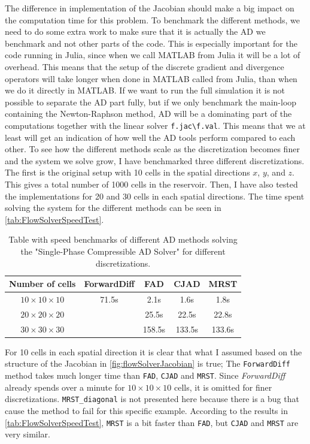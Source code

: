 The difference in implementation of the Jacobian should make a big impact on the computation time for this problem. To benchmark the different methods, we need to do some extra work to make sure that it is actually the AD we benchmark and not other parts of the code. This is especially important for the code running in Julia, since when we call MATLAB from Julia it will be a lot of overhead. This means that the setup of the discrete gradient and divergence operators will take longer when done in MATLAB called from Julia, than when we do it directly in MATLAB. If we want to run the full simulation it is not possible to separate the AD part fully, but if we only benchmark the main-loop containing the Newton-Raphson method, AD will be a dominating part of the computations together with the linear solver \texttt{f.jac\textbackslash f.val}. This means that we at least will get an indication of how well the AD tools perform compared to each other. To see how the different methods scale as the discretization becomes finer and the system we solve grow, I have benchmarked three different discretizations. The first is the original setup with 10 cells in the spatial directions $x$, $y$, and $z$. This gives a total number of 1000 cells in the reservoir. Then, I have also tested the implementations for 20 and 30 cells in each spatial directions. The time spent solving the system for the different methods can be seen in \autoref{tab:FlowSolverSpeedTest}.
\begin{table}[H]
    \centering
    \caption{Table with speed benchmarks of different AD methods solving the "Single-Phase Compressible AD Solver" for different discretizations.}
    \label{tab:FlowSolverSpeedTest}
    \def\arraystretch{1.5}
    \begin{tabular}{ccccc}
    \textbf{Number of cells} & \textbf{ForwardDiff} & \textbf{FAD} & \textbf{CJAD} & \textbf{MRST}\\
        \hline
         $10\times10\times10$ & 71.5s & 2.1s & 1.6s & 1.8s  \\  
         $20\times20\times20$ & ~ & 25.5s & 22.5s & 22.8s \\ 
         $30\times30\times30$ & ~ & 158.5s & 133.5s & 133.6s \\ \hline
    \end{tabular}
\end{table}
For 10 cells in each spatial direction it is clear that what I assumed based on the structure of the Jacobian in \autoref{fig:flowSolverJacobian} is true; The  \texttt{ForwardDiff} method takes much longer time than  \texttt{FAD}, \texttt{CJAD}  and \texttt{MRST}. Since  \textit{ForwardDiff} already spends over a minute for $10\times 10\times 10$ cells, it is omitted for finer discretizations. \texttt{MRST\_diagonal} is not presented here because there is a bug that cause the method to fail for this specific example. According to the results in \autoref{tab:FlowSolverSpeedTest}, \texttt{MRST} is a bit faster than  \texttt{FAD}, but \texttt{CJAD} and \texttt{MRST} are very similar. 

